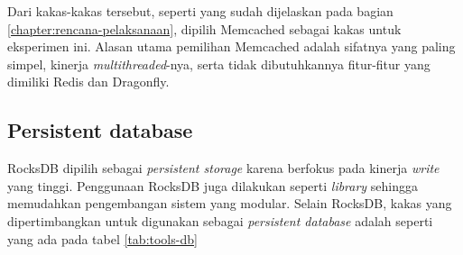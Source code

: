 Dari kakas-kakas tersebut, seperti yang sudah dijelaskan pada bagian \ref{chapter:rencana-pelaksanaan}, dipilih Memcached sebagai kakas untuk eksperimen ini. Alasan utama pemilihan Memcached adalah sifatnya yang paling simpel, kinerja \textit{multithreaded}-nya, serta tidak dibutuhkannya fitur-fitur yang dimiliki Redis dan Dragonfly.

\subsection{Persistent database}
RocksDB dipilih sebagai \textit{persistent storage} karena berfokus pada kinerja \textit{write} yang tinggi. Penggunaan RocksDB juga dilakukan seperti \textit{library} sehingga memudahkan pengembangan sistem yang modular. Selain RocksDB, kakas yang dipertimbangkan untuk digunakan sebagai \textit{persistent database} adalah seperti yang ada pada tabel \ref{tab:tools-db}

\begin{table}[h]
    \centering
    \caption{Perbandingan kakas persistent database}
    \label{tab:tools-db}
\end{table}

